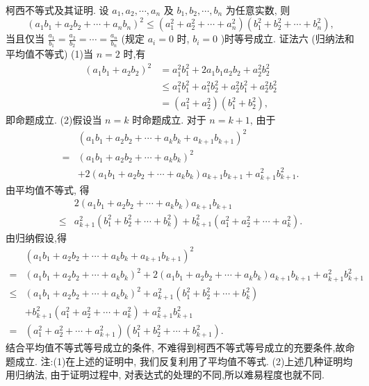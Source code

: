 柯西不等式及其证明.
设 $a_1, a_2, \cdots, a_n$ 及 $b_1, b_2, \cdots, b_n$ 为任意实数, 则
$$
\left(a_1 b_1+a_2 b_2+\cdots+a_n b_n\right)^2 \leqslant\left(a_1^2+a_2^2+\cdots+a_n^2\right)\left(b_1^2+b_2^2+\cdots+b_n^2\right),
$$
当且仅当 $\frac{a_1}{b_1}=\frac{a_2}{b_2}=\cdots=\frac{a_n}{b_n}$ (规定 $a_i=0$ 时, $b_i=0$ )时等号成立.
证法六 (归纳法和平均值不等式)
(1)当 $n=2$ 时,有
$$
\begin{aligned}
\left(a_1 b_1+a_2 b_2\right)^2 & =a_1^2 b_1^2+2 a_1 b_1 a_2 b_2+a_2^2 b_2^2 \\
& \leqslant a_1^2 b_1^2+a_1^2 b_2^2+a_2^2 b_1^2+a_2^2 b_2^2 \\
& =\left(a_1^2+a_2^2\right)\left(b_1^2+b_2^2\right),
\end{aligned}
$$
即命题成立.
(2)假设当 $n=k$ 时命题成立.
对于 $n=k+1$, 由于
$$
\begin{aligned}
& \left(a_1 b_1+a_2 b_2+\cdots+a_k b_k+a_{k+1} b_{k+1}\right)^2 \\
= & \left(a_1 b_1+a_2 b_2+\cdots+a_k b_k\right)^2 \\
& +2\left(a_1 b_1+a_2 b_2+\cdots+a_k b_k\right) a_{k+1} b_{k+1}+a_{k+1}^2 b_{k+1}^2 .
\end{aligned}
$$
由平均值不等式, 得
$$
\begin{aligned}
& 2\left(a_1 b_1+a_2 b_2+\cdots+a_k b_k\right) a_{k+1} b_{k+1} \\
\leqslant & a_{k+1}^2\left(b_1^2+b_2^2+\cdots+b_k^2\right)+b_{k+1}^2\left(a_1^2+a_2^2+\cdots+a_k^2\right) .
\end{aligned}
$$
由归纳假设,得
$$
\begin{aligned}
& \left(a_1 b_1+a_2 b_2+\cdots+a_k b_k+a_{k+1} b_{k+1}\right)^2 \\
= & \left(a_1 b_1+a_2 b_2+\cdots+a_k b_k\right)^2+2\left(a_1 b_1+a_2 b_2+\cdots+a_k b_k\right) a_{k+1} b_{k+1}+a_{k+1}^2 b_{k+1}^2 \\
\leqslant & \left(a_1 b_1+a_2 b_2+\cdots+a_k b_k\right)^2+a_{k+1}^2\left(b_1^2+b_2^2+\cdots+b_k^2\right) \\
& +b_{k+1}^2\left(a_1^2+a_2^2+\cdots+a_k^2\right)+a_{k+1}^2 b_{k+1}^2 \\
= & \left(a_1^2+a_2^2+\cdots+a_{k+1}^2\right)\left(b_1^2+b_2^2+\cdots+b_{k+1}^2\right) .
\end{aligned}
$$
结合平均值不等式等号成立的条件, 不难得到柯西不等式等号成立的充要条件,故命题成立.
注:(1)在上述的证明中, 我们反复利用了平均值不等式.
(2)上述几种证明均用归纳法, 由于证明过程中, 对表达式的处理的不同,所以难易程度也就不同.



